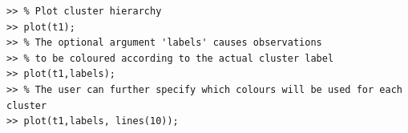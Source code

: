 \documentclass{book}
\begin{document}
\begin{verbatim}
>> % Plot cluster hierarchy
>> plot(t1); 
>> % The optional argument 'labels' causes observations
>> % to be coloured according to the actual cluster label
>> plot(t1,labels); 
>> % The user can further specify which colours will be used for each cluster
>> plot(t1,labels, lines(10)); 
\end{verbatim}


\begin{figure}
%
\begin{latexonly}
%
%

\end{latexonly}
\end{figure}
\end{document}
